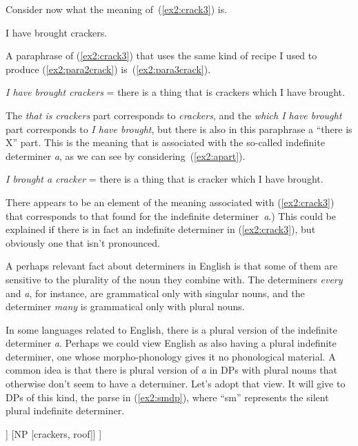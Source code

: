 Consider now what the meaning of~(\ref{ex2:crack3}) is.
\begin{exe}
	\raggedright
	\ex \label{ex2:crack3} 
	I have brought crackers.
\end{exe}
A paraphrase of (\ref{ex2:crack3}) that uses the same kind of recipe I used to produce (\ref{ex2:para2crack}) is~(\ref{ex2:para3crack}).
\begin{exe}
	\raggedright
	\ex \label{ex2:para3crack} 
	\emph{I have brought crackers} = there is a thing that is crackers which I have brought.
\end{exe}
The \emph{that is crackers} part corresponds to \emph{crackers}, and the \emph{which I have brought} part corresponds to \emph{I have brought}, but there is also in this paraphrase a ``there is X'' part. This is the meaning that is associated with the so-called indefinite determiner \emph{a}, as we can see by considering~(\ref{ex2:apart}).
\begin{exe}
	\raggedright
	\ex \label{ex2:apart} 
	\emph{I brought a cracker} = there is a thing that is cracker which I have brought.
\end{exe}
There appears to be an element of the meaning associated with (\ref{ex2:crack3}) that corresponds to that found for the indefinite determiner~\emph{a}.) This could be explained if there is in fact an indefinite determiner in (\ref{ex2:crack3}), but obviously one that isn't pronounced.

A perhaps relevant fact about determiners in English is that some of them are sensitive to the plurality of the noun they combine with. The determiners \emph{every} and \emph{a}, for instance, are grammatical only with singular nouns, and the determiner \emph{many} is grammatical only with plural nouns.
\begin{exe}
	\ex \label{ex2:dagree}
	\begin{xlist}
	\end{xlist}
\end{exe}
In some languages related to English, there is a plural version of the indefinite determiner \emph{a}. Perhaps we could view English as also having a plural indefinite determiner, one whose morpho-phonology gives it no phonological material. A common idea is that there is plural version of \emph{a} in DPs with plural nouns that otherwise don't seem to have a determiner. %
%
%
%
Let's adopt that view. It will give to DPs of this kind, the parse in (\ref{ex2:smdp}), where ``sm'' represents the silent plural indefinite determiner. %
%
%
%
\begin{exe}
	\raggedright
	\ex \label{ex2:smdp} 
	\small
\begin{forest}
[DP
	[\obar{D} [\shade{sm}]]
	[NP [crackers, roof]]
]
\end{forest}
\end{exe}

